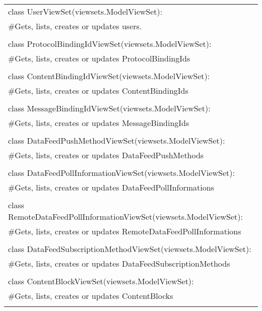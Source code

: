	\begin{center}
		\begin{tabular}{|l|}
			\hline
			class UserViewSet(viewsets.ModelViewSet):\\
			\#Gets, lists, creates or updates users.\\ \\
			
			class ProtocolBindingIdViewSet(viewsets.ModelViewSet):\\
			\#Gets, lists, creates or updates ProtocolBindingIds\\ \\
			
			class ContentBindingIdViewSet(viewsets.ModelViewSet):\\
			\#Gets, lists, creates or updates ContentBindingIds\\ \\
			
			class MessageBindingIdViewSet(viewsets.ModelViewSet):\\
			\#Gets, lists, creates or updates MessageBindingIds\\ \\
			
			class DataFeedPushMethodViewSet(viewsets.ModelViewSet):\\
			\#Gets, lists, creates or updates DataFeedPushMethods\\ \\
			
			class DataFeedPollInformationViewSet(viewsets.ModelViewSet):\\
			\#Gets, lists, creates or updates DataFeedPollInformations\\ \\
			
			class RemoteDataFeedPollInformationViewSet(viewsets.ModelViewSet):\\
			\#Gets, lists, creates or updates RemoteDataFeedPollInformations\\ \\
			
			class DataFeedSubscriptionMethodViewSet(viewsets.ModelViewSet):\\
			\#Gets, lists, creates or updates DataFeedSubscriptionMethods\\ \\
			
			class ContentBlockViewSet(viewsets.ModelViewSet):\\
			\#Gets, lists, creates or updates ContentBlocks\\ \\
			

\end{tabular}
\end{center}

